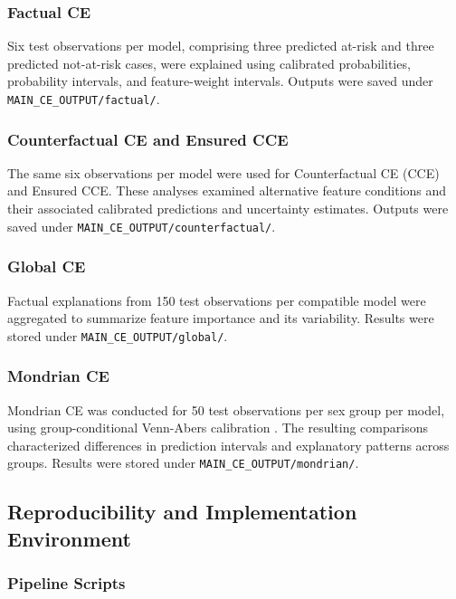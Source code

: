 \subsubsection{Factual CE}

Six test observations per model, comprising three predicted at-risk and three predicted not-at-risk cases, were explained using calibrated probabilities, probability intervals, and feature-weight intervals. Outputs were saved under \texttt{MAIN\_CE\_OUTPUT/factual/}.

\subsubsection{Counterfactual CE and Ensured CCE}

The same six observations per model were used for Counterfactual CE (CCE) and Ensured CCE. These analyses examined alternative feature conditions and their associated calibrated predictions and uncertainty estimates. Outputs were saved under \texttt{MAIN\_CE\_OUTPUT/counterfactual/}.

\subsubsection{Global CE}

Factual explanations from 150 test observations per compatible model were aggregated to summarize feature importance and its variability. Results were stored under \texttt{MAIN\_CE\_OUTPUT/global/}.

\subsubsection{Mondrian CE}

Mondrian CE was conducted for 50 test observations per sex group per model, using group-conditional Venn-Abers calibration \cite{lofstrom_conditional_ce_2024}. The resulting comparisons characterized differences in prediction intervals and explanatory patterns across groups. Results were stored under \texttt{MAIN\_CE\_OUTPUT/mondrian/}.

\subsection{Reproducibility and Implementation Environment}

\subsubsection{Pipeline Scripts}

